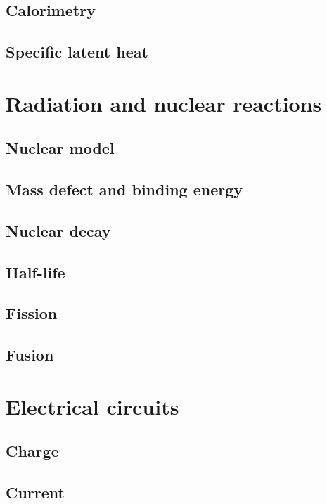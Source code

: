 \documentclass{book}
\begin{document}
\section{Calorimetry}


\section{Specific latent heat}



\chapter{Radiation and nuclear reactions}
\section{Nuclear model}


\section{Mass defect and binding energy}


\section{Nuclear decay}


\section{Half-life}


\section{Fission}


\section{Fusion}



\chapter{Electrical circuits}
\section{Charge}


\section{Current}
\end{document}
